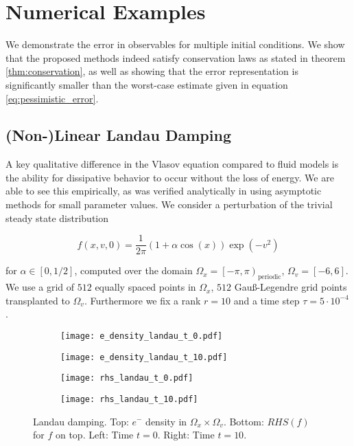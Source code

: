 
\section{Numerical Examples}

We demonstrate the error in observables for multiple initial conditions. We show that 
the proposed methods indeed satisfy conservation laws as stated in theorem 
\ref{thm:conservation}, as well as showing that the error representation is significantly 
smaller than the worst-case estimate given in equation \ref{eq:pessimistic_error}. 

\subsection{(Non-)Linear Landau Damping}\label{sec:landau}

A key qualitative difference in the Vlasov equation compared to fluid models is the 
ability for dissipative behavior to occur without the loss of energy. We are able to 
see this empirically, as was verified analytically in \cite{landau} using asymptotic 
methods for small parameter values. We consider a perturbation of the trivial steady 
state distribution 

\begin{equation}
    f(x, v, 0) = \frac{1}{2 \pi}(1 + \alpha \cos (x)) \exp (-v^2)
\end{equation}

for $\alpha \in \left[ 0, 1/2 \right]$, computed over the domain 
$\Omega_x = \left[ -\pi, \pi \right)_{\text{periodic}}$, 
$\Omega_v = \left[ -6, 6 \right]$. We use a grid of $512$ equally spaced points in 
$\Omega_x$, $512$ Gauß-Legendre grid points transplanted to $\Omega_v$. Furthermore we 
fix a rank $r = 10$ and a time step $\tau = 5 \cdot 10^{-4}$. 

\begin{figure}
    \centering
    \begin{subfigure}{0.45\textwidth}
        \texttt{[image: e\_density\_landau\_t\_0.pdf]}
    \end{subfigure}
    \begin{subfigure}{0.45\textwidth}
        \texttt{[image: e\_density\_landau\_t\_10.pdf]}
    \end{subfigure}
    \begin{subfigure}{0.45\textwidth}
        \texttt{[image: rhs\_landau\_t\_0.pdf]}
    \end{subfigure}
    \begin{subfigure}{0.45\textwidth}
        \texttt{[image: rhs\_landau\_t\_10.pdf]}
    \end{subfigure}
    \caption{
        Landau damping. 
        Top: $e^-$ density in $\Omega_x \times \Omega_v$. 
        Bottom: $RHS(f)$ for $f$ on top. 
        Left: Time $t = 0$. 
        Right: Time $t = 10$. 
    }\label{fig:density}
\end{figure}

